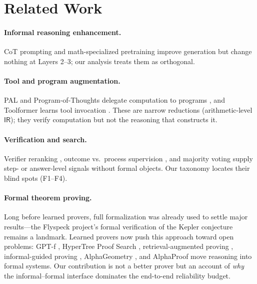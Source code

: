 \documentclass[11pt,a4paper]{article}
\newcommand{\ir}{\mathsf{IR}}
\begin{document}
\section{Related Work}\label{sec:related}

\paragraph{Informal reasoning enhancement.} CoT prompting \citep{wei2022cot} and math-specialized pretraining \citep{lewkowycz2022minerva,azerbayev2024llemma} improve generation but change nothing at Layers 2--3; our analysis treats them as orthogonal.

\paragraph{Tool and program augmentation.} PAL and Program-of-Thoughts delegate computation to programs \citep{gao2023pal,chen2023pot}, and Toolformer learns tool invocation \citep{schick2023toolformer}. These are narrow reductions (arithmetic-level $\ir$); they verify computation but not the reasoning that constructs it.

\paragraph{Verification and search.} Verifier reranking \citep{cobbe2021gsm8k}, outcome vs.\ process supervision \citep{uesato2022feedback,lightman2024verify}, and majority voting \citep{zhou2024dtv} supply step- or answer-level signals without formal objects. Our taxonomy locates their blind spots (F1--F4).

\paragraph{Formal theorem proving.} Long before learned provers, full formalization was already used to settle major results---the Flyspeck project's formal verification of the Kepler conjecture \citep{hales2017kepler} remains a landmark. Learned provers now push this approach toward open problems: GPT-f \citep{polu2020gptf}, HyperTree Proof Search \citep{lample2022htps}, retrieval-augmented proving \citep{yang2023leandojo}, informal-guided proving \citep{jiang2023draft}, AlphaGeometry \citep{trinh2024alphageometry}, and AlphaProof \citep{hubert2025alphaproof} move reasoning into formal systems. Our contribution is not a better prover but an account of \emph{why} the informal--formal interface dominates the end-to-end reliability budget.
\end{document}
